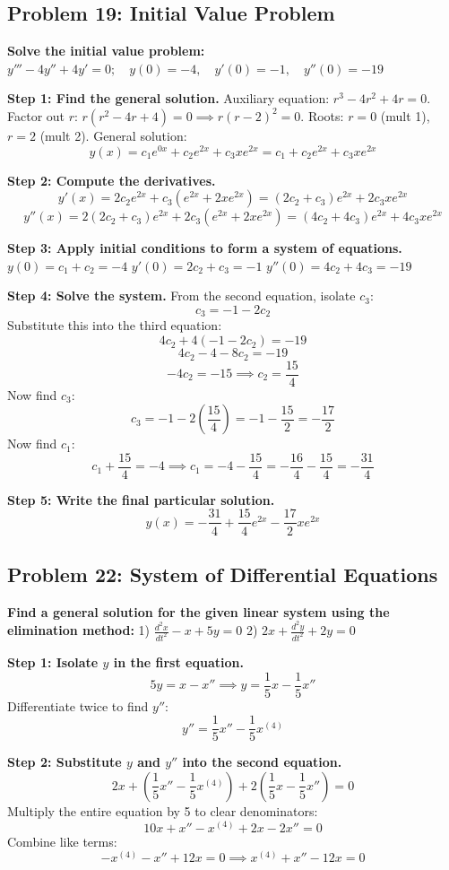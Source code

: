 \documentclass[11pt]{article}
\begin{document}
\subsection{Problem 19: Initial Value Problem}
\textbf{Solve the initial value problem:} $y''' - 4y'' + 4y' = 0; \quad y(0) = -4, \quad y'(0) = -1, \quad y''(0) = -19$

\textbf{Step 1: Find the general solution.}
Auxiliary equation: $r^3 - 4r^2 + 4r = 0$.
Factor out $r$: $r(r^2 - 4r + 4) = 0 \implies r(r - 2)^2 = 0$.
Roots: $r = 0$ (mult 1), $r = 2$ (mult 2).
General solution: 
\[ y(x) = c_1 e^{0x} + c_2 e^{2x} + c_3 x e^{2x} = c_1 + c_2 e^{2x} + c_3 x e^{2x} \]

\textbf{Step 2: Compute the derivatives.}
\[ y'(x) = 2c_2 e^{2x} + c_3(e^{2x} + 2x e^{2x}) = (2c_2 + c_3)e^{2x} + 2c_3 x e^{2x} \]
\[ y''(x) = 2(2c_2 + c_3)e^{2x} + 2c_3(e^{2x} + 2x e^{2x}) = (4c_2 + 4c_3)e^{2x} + 4c_3 x e^{2x} \]

\textbf{Step 3: Apply initial conditions to form a system of equations.}
$y(0) = c_1 + c_2 = -4$
$y'(0) = 2c_2 + c_3 = -1$
$y''(0) = 4c_2 + 4c_3 = -19$

\textbf{Step 4: Solve the system.}
From the second equation, isolate $c_3$:
\[ c_3 = -1 - 2c_2 \]
Substitute this into the third equation:
\[ 4c_2 + 4(-1 - 2c_2) = -19 \]
\[ 4c_2 - 4 - 8c_2 = -19 \]
\[ -4c_2 = -15 \implies c_2 = \frac{15}{4} \]
Now find $c_3$:
\[ c_3 = -1 - 2\left(\frac{15}{4}\right) = -1 - \frac{15}{2} = -\frac{17}{2} \]
Now find $c_1$:
\[ c_1 + \frac{15}{4} = -4 \implies c_1 = -4 - \frac{15}{4} = -\frac{16}{4} - \frac{15}{4} = -\frac{31}{4} \]

\textbf{Step 5: Write the final particular solution.}
\[ y(x) = -\frac{31}{4} + \frac{15}{4} e^{2x} - \frac{17}{2} x e^{2x} \]

\subsection{Problem 22: System of Differential Equations}
\textbf{Find a general solution for the given linear system using the elimination method:}
1) $\frac{d^2x}{dt^2} - x + 5y = 0$
2) $2x + \frac{d^2y}{dt^2} + 2y = 0$

\textbf{Step 1: Isolate $y$ in the first equation.}
\[ 5y = x - x'' \implies y = \frac{1}{5}x - \frac{1}{5}x'' \]
Differentiate twice to find $y''$:
\[ y'' = \frac{1}{5}x'' - \frac{1}{5}x^{(4)} \]

\textbf{Step 2: Substitute $y$ and $y''$ into the second equation.}
\[ 2x + \left(\frac{1}{5}x'' - \frac{1}{5}x^{(4)}\right) + 2\left(\frac{1}{5}x - \frac{1}{5}x''\right) = 0 \]
Multiply the entire equation by 5 to clear denominators:
\[ 10x + x'' - x^{(4)} + 2x - 2x'' = 0 \]
Combine like terms:
\[ -x^{(4)} - x'' + 12x = 0 \implies x^{(4)} + x'' - 12x = 0 \]
\end{document}
